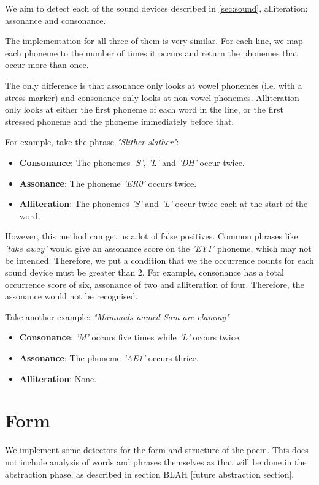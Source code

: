 We aim to detect each of the sound devices described in \ref{sec:sound}, alliteration; assonance and consonance.

The implementation for all three of them is very similar. For each line, we map each phoneme to the number of times it occurs and return the  phonemes that occur more than once.

The only difference is that assonance only looks at vowel phonemes (i.e. with a stress marker) and consonance only looks at non-vowel phonemes. Alliteration only looks at either the first phoneme of each word in the line, or the first stressed phoneme and the  phoneme immediately before that.

For example, take the phrase \textit{"Slither slather"}:
\begin{itemize}
\item{\textbf{Consonance}: The phonemes \textit{'S'}, \textit{'L'} and \textit{'DH'} occur twice.}
\item{\textbf{Assonance}: The phoneme \textit{'ER0'} occurs twice.}
\item{\textbf{Alliteration}: The phonemes \textit{'S'} and \textit{'L'} occur twice each at the start of the word.}
\end{itemize}

However, this method can get us a lot of false positives. Common phrases like \textit{'take away'} would give an assonance score on the \textit{'EY1'} phoneme, which may not be intended. Therefore, we put a condition that we the occurrence counts for each sound device must be greater than 2. For example, consonance has a total occurrence score of six, assonance of two and alliteration of four. Therefore, the assonance would not be recognised.

Take another example: \textit{"Mammals named Sam are clammy"}
\begin{itemize}
\item{\textbf{Consonance}: \textit{'M'} occurs five times while \textit{'L'} occurs twice.}
\item{\textbf{Assonance}: The phoneme \textit{'AE1'} occurs thrice.}
\item{\textbf{Alliteration}: None.}
\end{itemize}

\section{Form}

We implement some detectors for the form and structure of the poem. This does not include analysis of words and phrases themselves as that will be done in the abstraction phase, as described in section BLAH [future abstraction section].

